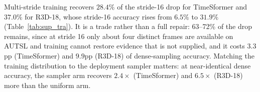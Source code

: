 \documentclass[a4paper, 10pt, conference, onecolumn]{ieeeconf}
\begin{document}
Multi-stride training recovers $28.4\%$ of the stride-16 drop for TimeSformer
and $37.0\%$ for R3D-18, whose stride-16 accuracy rises from $6.5\%$ to
$31.9\%$ (Table~\ref{tab:sup_tra}). It is a trade rather than a full repair:
63--72\% of the drop remains, since at stride 16 only about four distinct frames
are available on AUTSL and training cannot restore evidence that is not
supplied, and it costs $3.3$pp (TimeSformer) and $9.9$pp (R3D-18) of
dense-sampling accuracy. Matching the training distribution to the deployment
sampler matters: at near-identical dense accuracy, the sampler arm recovers
$2.4\times$ (TimeSformer) and $6.5\times$ (R3D-18) more than the uniform arm.

{\small


}
\end{document}
